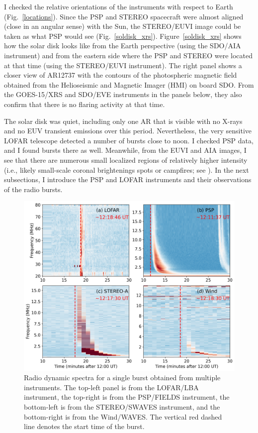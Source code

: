 I checked the relative orientations of the instruments with respect to Earth (Fig.~\ref{locations}). Since the PSP and STEREO spacecraft were almost aligned (close in an angular sense) with the Sun, the STEREO/EUVI image could be taken as what PSP would see (Fig.~\ref{soldisk_xrs}).
Figure~\ref{soldisk_xrs} shows how the solar disk looks like from the Earth perspective (using the SDO/AIA instrument) and from the eastern side where the PSP and STEREO were located at that time (using the STEREO/EUVI instrument).
The right panel shows a closer view of AR12737 with the contours of the photospheric magnetic field obtained from the Helioseismic and Magnetic Imager (HMI) on board SDO.
From the GOES-15/XRS and SDO/EVE instruments in the panels below, they also confirm that there is no flaring activity at that time.

The solar disk was quiet, including only one AR that is visible with no X-rays and no EUV transient emissions over this period.
Nevertheless, the very sensitive LOFAR telescope detected a number of bursts close to noon. I checked PSP data, and I found bursts there as well.
Meanwhile, from the EUVI and AIA images, I see that there are numerous small localized regions of relatively higher intensity (i.e., likely small-scale coronal brightenings spots or campfires; see \cite{young_2018, madjarska_2019, berghmans_2021}).
In the next subsections, I introduce the PSP and LOFAR instruments and their observations of the radio bursts.

\begin{figure}
\centering
\includegraphics[width=0.9\hsize]{chapter3/figs/all_dyspec.png}
\caption{Radio dynamic spectra for a single burst obtained from multiple instruments. The top-left panel is from the LOFAR/LBA instrument, the top-right is from the PSP/FIELDS instrument, the bottom-left is from the STEREO/SWAVES instrument, and the bottom-right is from the Wind/WAVES. The vertical red dashed line denotes the start time of the burst.}
\label{fig_alldyspec}
\end{figure}

